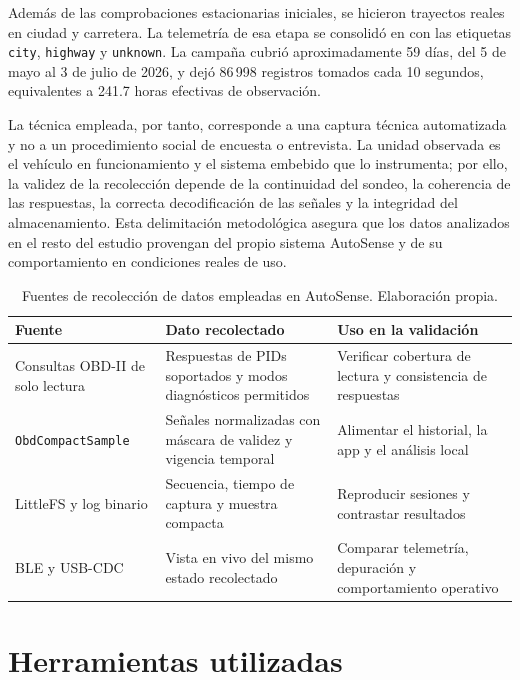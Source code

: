 \documentclass[12pt,letterpaper]{report}
\begin{document}
Además de las comprobaciones estacionarias iniciales, se hicieron trayectos reales en ciudad y carretera. La telemetría de esa etapa se consolidó en  con las etiquetas \texttt{city}, \texttt{highway} y \texttt{unknown}. La campaña cubrió aproximadamente 59 días, del 5 de mayo al 3 de julio de 2026, y dejó 86\,998 registros tomados cada 10 segundos, equivalentes a 241.7 horas efectivas de observación.

La técnica empleada, por tanto, corresponde a una captura técnica automatizada y no a un procedimiento social de encuesta o entrevista. La unidad observada es el vehículo en funcionamiento y el sistema embebido que lo instrumenta; por ello, la validez de la recolección depende de la continuidad del sondeo, la coherencia de las respuestas, la correcta decodificación de las señales y la integridad del almacenamiento. Esta delimitación metodológica asegura que los datos analizados en el resto del estudio provengan del propio sistema AutoSense y de su comportamiento en condiciones reales de uso.

\begin{table}[!htbp]
\centering
\caption{Fuentes de recolección de datos empleadas en AutoSense. Elaboración propia.}
\label{tab:fuentes-recoleccion-datos}
\renewcommand{\arraystretch}{1.08}
\small
\begin{tabular}{p{}p{}p{}}
\toprule
Fuente & Dato recolectado & Uso en la validación \\
\midrule
Consultas OBD-II de solo lectura & Respuestas de PIDs soportados y modos diagnósticos permitidos & Verificar cobertura de lectura y consistencia de respuestas \\
\texttt{ObdCompactSample} & Señales normalizadas con máscara de validez y vigencia temporal & Alimentar el historial, la app y el análisis local \\
LittleFS y log binario & Secuencia, tiempo de captura y muestra compacta & Reproducir sesiones y contrastar resultados \\
BLE y USB-CDC & Vista en vivo del mismo estado recolectado & Comparar telemetría, depuración y comportamiento operativo \\
\bottomrule
\end{tabular}
\end{table}

\section{Herramientas utilizadas}
\end{document}

